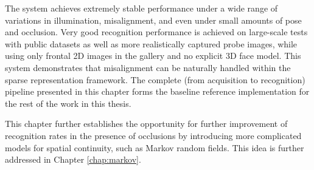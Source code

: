 The system achieves extremely stable performance under a wide range of
variations in illumination, misalignment, and even under small amounts of pose
and occlusion. Very good recognition performance is achieved on large-scale
tests with public datasets as well as more realistically captured probe images,
while using only frontal 2D images in the gallery and no explicit 3D face
model.  This system demonstrates that misalignment can be naturally handled
within the sparse representation framework.  The complete (from acquisition to
recognition) pipeline presented in this chapter forms the baseline reference
implementation for the rest of the work in this thesis.

This chapter further establishes the opportunity for further improvement of
recognition rates in the presence of occlusions by introducing more complicated
models for spatial continuity, such as Markov random fields.  This idea is
further addressed in Chapter \ref{chap:markov}.

